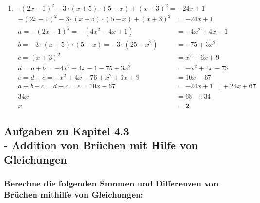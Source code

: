 \documentclass[a4paper,10pt]{article} %
\begin{document}
\begin{enumerate}[label=\alph*)]
  \item \(-{(2x - 1)}^2 - 3 \cdot (x + 5) \cdot (5 - x) + {(x + 3)}^2 = -24x + 1\)
  \[
    \begin{aligned}
      -{(2x - 1)}^2 - 3 \cdot (x + 5) \cdot (5 - x) + {(x + 3)}^2 &= -24x + 1 \\
      a = -{(2x - 1)}^2 = -(4x^2 - 4x + 1) &= -4x^2 + 4x - 1\\
      b = -3 \cdot (x + 5) \cdot (5 - x) = -3 \cdot (25 - x^2) &= -75 + 3x^2\\
      c = {(x + 3)}^2 &= x^2 + 6x + 9 \\
      d = a + b = -4x^2 + 4x - 1 - 75 + 3x^2 &= -x^2 + 4x - 76 \\
      e = d + c = -x^2 + 4x - 76 + x^2 + 6x + 9 &= 10x - 67 \\
      a + b + c = d + c = e = 10x - 67 &= -24x + 1 \quad\big| + 24x + 67 \\
      34x &= 68 \quad\big| : 34 \\
      x &= \mathbf{2}
    \end{aligned}
  \]

\end{enumerate}

\subsection{Aufgaben zu Kapitel 4.3 \\
  - Addition von Brüchen mit Hilfe von Gleichungen}

\subsubsection{Berechne die folgenden Summen und Differenzen von Brüchen mithilfe von Gleichungen:} %
\end{document}
